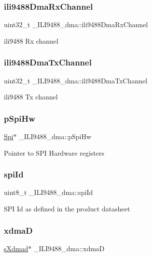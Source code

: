 \subsubsection{\texorpdfstring{ili9488DmaRxChannel}{ili9488DmaRxChannel}}
{\footnotesize\ttfamily uint32\+\_\+t \+\_\+\+I\+L\+I9488\+\_\+dma\+::ili9488\+Dma\+Rx\+Channel}

ili9488 Rx channel \mbox{\label{struct__ILI9488__dma_ac86a460f0aabb47145e2d507f1c0e235}} 
\subsubsection{\texorpdfstring{ili9488DmaTxChannel}{ili9488DmaTxChannel}}
{\footnotesize\ttfamily uint32\+\_\+t \+\_\+\+I\+L\+I9488\+\_\+dma\+::ili9488\+Dma\+Tx\+Channel}

ili9488 Tx channel \mbox{\label{struct__ILI9488__dma_af7b405a03b587ddbe83dd8b6cd7b67f9}} 
\subsubsection{\texorpdfstring{pSpiHw}{pSpiHw}}
{\footnotesize\ttfamily \mbox{\hyperlink{structSpi}{Spi}}$\ast$ \+\_\+\+I\+L\+I9488\+\_\+dma\+::p\+Spi\+Hw}

Pointer to S\+PI Hardware registers \mbox{\label{struct__ILI9488__dma_af814325d4ce3d9f8238e346f19f75ebb}} 
\subsubsection{\texorpdfstring{spiId}{spiId}}
{\footnotesize\ttfamily uint8\+\_\+t \+\_\+\+I\+L\+I9488\+\_\+dma\+::spi\+Id}

S\+PI Id as defined in the product datasheet \mbox{\label{struct__ILI9488__dma_a491325a84721327f7140fa5aa5fb9669}} 
\subsubsection{\texorpdfstring{xdmaD}{xdmaD}}
{\footnotesize\ttfamily \mbox{\hyperlink{group__dmad__structs_gaf2c13151514615a6beb35c0d868a5053}{s\+Xdmad}}$\ast$ \+\_\+\+I\+L\+I9488\+\_\+dma\+::xdmaD}

